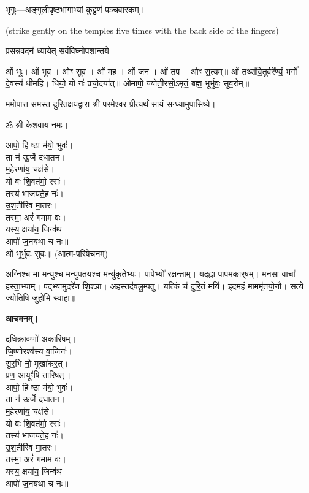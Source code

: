 
भृगुः—अङ्गुलीपृष्ठभागाभ्यां कुट्टणं पञ्चवारकम्।

{\scriptsize (strike gently on the temples five times with the back side of the fingers)}

{प्रसन्नवदनं ध्यायेत् सर्वविघ्नोपशान्तये}


ओं भूः। ओं भुव। ओꣳ सुव। ओं मह। ओं जन। ओं तप। ओꣳ स॒त्यम्॥
ओं तथ्स॑वि॒तुर्वरे᳚ण्यं॒ भर्गो॑ दे॒वस्य॑ धीमहि। धियो॒ यो नः॑ प्रचो॒दया᳚त्॥
ओमापो॒ ज्योती॒रसो॒ऽमृतं॒ ब्रह्म॒ भूर्भुवः॒ सुव॒रोम्॥


ममोपात्त-समस्त-दुरितक्षयद्वारा श्री-परमेश्वर-प्रीत्यर्थं सायं सन्ध्यामुपासिष्ये।


ॐ श्री केशवाय नमः।

आपो॒ हि ष्ठा म॑यो॒ भुवः॑।\\
ता न॑ ऊ॒र्जे द॑धातन।\\
म॒हेरणा॑य॒ चक्ष॑से।\\
यो वः॑ शि॒वत॑मो॒ रसः॑।\\
तस्य॑ भाजयते॒ह नः॑।\\
उ॒श॒तीरि॑व मा॒तरः॑।\\
तस्मा॒ अरं॑ गमाम वः।\\
यस्य॒ क्षया॑य॒ जिन्व॑थ।\\
आपो॑ ज॒नय॑था च नः॥\\

ओं भूर्भुवः॒ सुवः॑॥ (आत्म-परिषेचनम्)


अग्निश्च मा मन्युश्च मन्युपतयश्च मन्यु॑कृते॒भ्यः। पापेभ्यो॑ रक्ष॒न्ताम्। यदह्ना पाप॑मका॒र्‌षम्। मनसा वाचा॑ हस्ता॒भ्याम्। पद्भ्यामुदरे॑ण शि॒श्ञा। अह॒स्तद॑वलु॒म्पतु। यत्किं च॑ दुरि॒तं मयि॑। इदमहं माममृ॑तयो॒नौ। सत्ये ज्योतिषि जुहो॑मि स्वा॒हा॥


\textbf{आचमनम्।}

द॒धि॒क्राव्ण्णो॑ अकारिषम्।\\
 जि॒ष्णोरश्व॑स्य वा॒जिनः॑।\\
सु॒र॒भि नो॒ मुखा॑कर॒त्।\\
प्रण॒ आयूꣳ॑षि तारिषत्॥\\



आपो॒ हि ष्ठा म॑यो॒ भुवः॑।\\
ता न॑ ऊ॒र्जे द॑धातन।\\
म॒हेरणा॑य॒ चक्ष॑से।\\
यो वः॑ शि॒वत॑मो॒ रसः॑।\\
तस्य॑ भाजयते॒ह नः॑।\\
उ॒श॒तीरि॑व मा॒तरः॑।\\
तस्मा॒ अरं॑ गमाम वः।\\
यस्य॒ क्षया॑य॒ जिन्व॑थ।\\
आपो॑ ज॒नय॑था च नः॥\\

